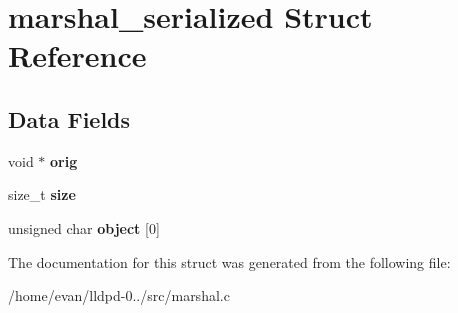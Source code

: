 \section{marshal\-\_\-serialized \-Struct \-Reference}
\label{structmarshal__serialized}
\subsection*{\-Data \-Fields}
\begin{DoxyCompactItemize}
\item 
void $\ast$ {\bfseries orig}\label{structmarshal__serialized_a222fe45357e34710f8de3bbbf3bcc415}

\item 
size\-\_\-t {\bfseries size}\label{structmarshal__serialized_a854352f53b148adc24983a58a1866d66}

\item 
unsigned char {\bfseries object} [0]\label{structmarshal__serialized_ad129188b0b35f44425014140809112b0}

\end{DoxyCompactItemize}


\-The documentation for this struct was generated from the following file\-:\begin{DoxyCompactItemize}
\item 
/home/evan/lldpd-\/0../src/marshal.\-c\end{DoxyCompactItemize}
